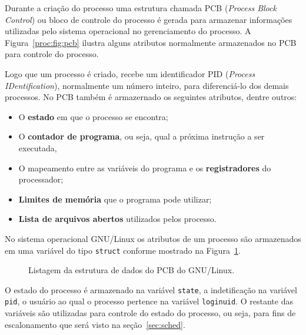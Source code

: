 Durante a criação do processo uma estrutura chamada PCB
(\textit{Process Block Control}) ou bloco de controle do processo é
gerada para armazenar informações utilizadas pelo sistema operacional
no gerenciamento do processo. A Figura~\ref{proc:fig:pcb} ilustra
alguns atributos normalmente armazenados no PCB para controle do
processo. 

Logo que um processo é criado, recebe um identificador PID
(\textit{Process IDentification}), normalmente um número inteiro, para
diferenciá-lo dos demais processos. No PCB também é
armazernado os seguintes atributos, dentre outros:

\begin{itemize}
\item O {\bf estado} em que o processo se encontra;
\item O {\bf contador de programa}, ou seja, qual a próxima instrução a ser
  executada,
\item O mapeamento entre as variáveis do programa e os {\bf registradores}
  do processador;
\item {\bf Limites de memória} que o programa pode utilizar;
\item {\bf Lista de arquivos abertos} utilizados pelos processo.
\end{itemize}



No sistema operacional GNU/Linux os atributos de um processo são
armazenados em uma variável do tipo {\tt struct} conforme mostrado na
Figura~\ref{proc:src:sched}.

\begin{figure}[ht]

\label{proc:src:sched}
\caption{Listagem da estrutura de dados do PCB do GNU/Linux.}
\end{figure}

O estado do processo é armazenado na variável {\tt state}, a
indetificação na variável {\tt pid}, o usuário ao qual o processo
pertence na variável {\tt loginuid}. O restante das variáveis são
utilizadas para controle do estado do processo, ou seja, para fins de
escalonamento que será visto na seção~\ref{sec:sched}.